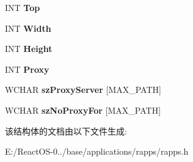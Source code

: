 \begin{DoxyCompactItemize}
I\+NT {\bfseries Top}
\item 
\mbox{\label{struct_s_e_t_t_i_n_g_s___i_n_f_o_a14cc44537ca751036151d39eec0b2c3c}} 
I\+NT {\bfseries Width}
\item 
\mbox{\label{struct_s_e_t_t_i_n_g_s___i_n_f_o_aae1ca0acc7df4b8d061feef7f931a718}} 
I\+NT {\bfseries Height}
\item 
\mbox{\label{struct_s_e_t_t_i_n_g_s___i_n_f_o_a0550fe1b0e14237fcdbc70dfff8392f5}} 
I\+NT {\bfseries Proxy}
\item 
\mbox{\label{struct_s_e_t_t_i_n_g_s___i_n_f_o_ae19032baef6de3a9ef7e014d4c2e7c24}} 
W\+C\+H\+AR {\bfseries sz\+Proxy\+Server} \mbox{[}M\+A\+X\+\_\+\+P\+A\+TH\mbox{]}
\item 
\mbox{\label{struct_s_e_t_t_i_n_g_s___i_n_f_o_aabe0c67061028909799cbaf01425790f}} 
W\+C\+H\+AR {\bfseries sz\+No\+Proxy\+For} \mbox{[}M\+A\+X\+\_\+\+P\+A\+TH\mbox{]}
\end{DoxyCompactItemize}


该结构体的文档由以下文件生成\+:\begin{DoxyCompactItemize}
\item 
E\+:/\+React\+O\+S-\/0../base/applications/rapps/rapps.\+h\end{DoxyCompactItemize}
